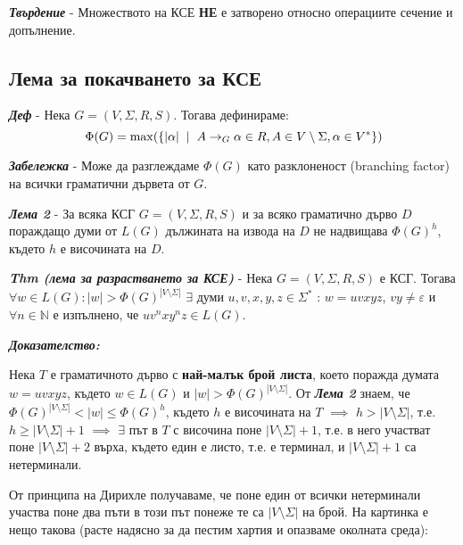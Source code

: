 \documentclass[fleqn,12pt]{article}
\DeclareMathOperator{\mmax}{max}
\begin{document}
\noindent\textit{\textbf{Твърдение}} - Множеството на КСЕ \textbf{НЕ} е затворено относно операциите сечение и допълнение.

\subsection{Лема за покачването за КСЕ}

\noindent\textit{\textbf{Деф}} - Нека $G = (V, \Sigma, R, S)$. Тогава дефинираме: 
\[\Phi(G) = \mmax(\{|\alpha| \hspace{2mm} | \hspace{2mm} A \to_G \alpha \in R, A \in V \setminus \Sigma, \alpha \in V^*\}) \]

\noindent\textit{\textbf{Забележка}} - Може да разглеждаме $\Phi(G)$ като разклоненост (branching factor) на всички граматични дървета от $G$.

\noindent\textit{\textbf{Лема 2}} - За всяка КСГ $G = (V, \Sigma, R, S)$ и за всяко граматично дърво $D$ пораждащо думи от $L(G)$ дължината на извода на $D$ не надвищава $\Phi(G)^h$, където $h$ е височината на $D$.

\noindent\textit{\textbf{Thm (лема за разрастването за КСЕ)}} - Нека $G = (V, \Sigma, R, S)$ е КСГ. 
Тогава $\forall w \in L(G): |w| > \Phi(G)^{|V \setminus \Sigma|}$  $\exists$ думи $u, v, x, y, z \in \Sigma^*$ : $w=uvxyz$, $vy \neq \varepsilon$ и $\forall n \in \mathbb{N}$ е изпълнено, че $uv^nxy^nz \in L(G)$.

\noindent\textit{\textbf{Доказателство:}}

Нека $T$ е граматичното дърво с \textbf{най-малък брой листа}, което поражда думата $w = uvxyz$, 
където $w \in L(G)$ и $|w| > \Phi(G)^{|V \setminus \Sigma|}$. 
От \textit{\textbf{Лема 2}} знаем, че $\Phi(G)^{|V \setminus \Sigma|} < |w| \leq \Phi(G)^h$, където $h$ е височината на $T$ $\implies$ $h > |V \setminus \Sigma|$, т.е. $h \geq |V \setminus \Sigma| + 1$ $\implies$ 
$\exists$ път в $T$ с височина поне $|V \setminus \Sigma| + 1$, т.е. в него участват поне $|V \setminus \Sigma| + 2$ върха, където един е листо, т.е. е терминал, и $|V \setminus \Sigma| + 1$ са нетерминали.

От принципа на Дирихле получаваме, че поне един от всички нетерминали участва поне два пъти в този път понеже те са $|V \setminus \Sigma|$ на брой. 
На картинка е нещо такова (расте надясно за да пестим хартия и опазваме околната среда):

\begin{center}
\end{center}
\end{document}
